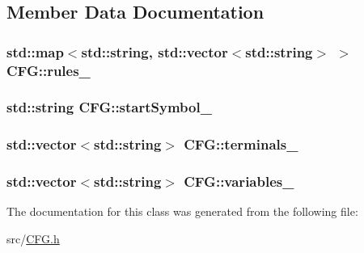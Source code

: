 \subsection{Member Data Documentation}
\hypertarget{classCFG_a6f148c60599eec412d168d2353b7b814}{
\subsubsection[{rules\-\_\-}]{\setlength{\rightskip}{0pt plus 5cm}std\-::map$<$std\-::string, std\-::vector$<$std\-::string$>$ $>$ C\-F\-G\-::rules\-\_\-\hspace{0.3cm}{\ttfamily [protected]}}}\label{classCFG_a6f148c60599eec412d168d2353b7b814}
\hypertarget{classCFG_a21527e2ffbb0b5bf8995ebae725858eb}{
\subsubsection[{start\-Symbol\-\_\-}]{\setlength{\rightskip}{0pt plus 5cm}std\-::string C\-F\-G\-::start\-Symbol\-\_\-\hspace{0.3cm}{\ttfamily [protected]}}}\label{classCFG_a21527e2ffbb0b5bf8995ebae725858eb}
\hypertarget{classCFG_ac105b578d6237fc6ff28e54c98bbb1b8}{
\subsubsection[{terminals\-\_\-}]{\setlength{\rightskip}{0pt plus 5cm}std\-::vector$<$std\-::string$>$ C\-F\-G\-::terminals\-\_\-\hspace{0.3cm}{\ttfamily [protected]}}}\label{classCFG_ac105b578d6237fc6ff28e54c98bbb1b8}
\hypertarget{classCFG_a7369373d17b20520d7b72d43f471cda9}{
\subsubsection[{variables\-\_\-}]{\setlength{\rightskip}{0pt plus 5cm}std\-::vector$<$std\-::string$>$ C\-F\-G\-::variables\-\_\-\hspace{0.3cm}{\ttfamily [protected]}}}\label{classCFG_a7369373d17b20520d7b72d43f471cda9}


The documentation for this class was generated from the following file\-:\begin{DoxyCompactItemize}
\item 
src/\hyperlink{CFG_8h}{C\-F\-G.\-h}\end{DoxyCompactItemize}
